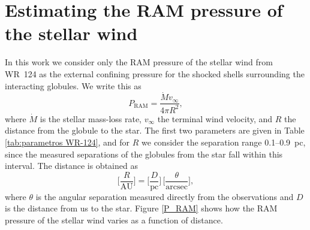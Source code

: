 \documentclass{book}
\begin{document}


  \section{Estimating the RAM pressure of the stellar wind}

In this work we consider only the RAM pressure of the stellar wind
from WR~124 as the external confining pressure for the shocked shells
surrounding the interacting globules. We write this as
\begin{equation}
 P_\mathrm{RAM}= \frac{\dot{M}v_\infty}{4\pi R^2},    
\end{equation}
where $\dot{M}$ is the stellar mass-loss rate, $v_\infty$ the terminal
wind velocity, and $R$ the distance from the globule to the star. The
first two parameters are given in Table \ref{tab:parametros WR-124},
and for $R$ we consider the separation range 0.1--\SI{0.9}{pc}, since
the measured separations of the globules from the star fall within
this interval. The distance is obtained as
\begin{equation}
    \Big[\frac{R}{\mathrm{AU}}\Big] = \Big[\frac{D}{\mathrm{pc}}\Big]\,\Big[\frac{\theta}{\mathrm{arcsec}}\Big],
\end{equation}
where $\theta$ is the angular separation measured directly from the
observations and $D$ is the distance from us to the star. Figure
\ref{P_RAM} shows how the RAM pressure of the stellar wind varies as a
function of distance.
\end{document}
